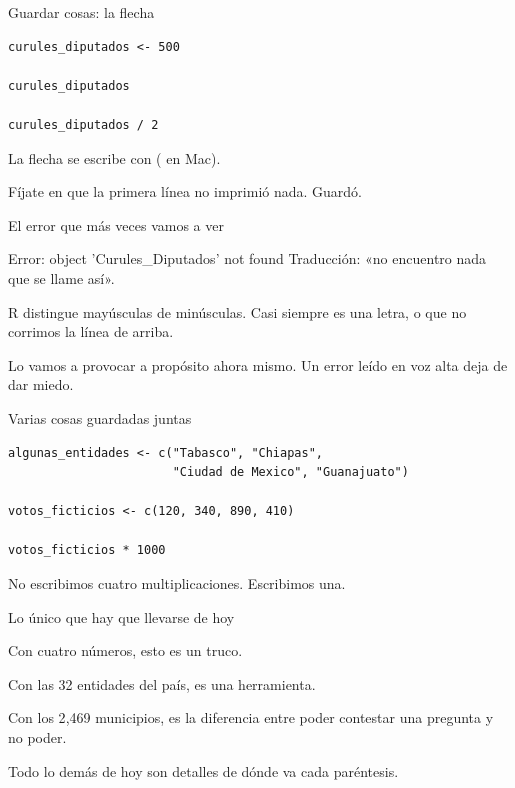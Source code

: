\begin{frame}[fragile]{Guardar cosas: la flecha}
\begin{lstlisting}
curules_diputados <- 500

curules_diputados

curules_diputados / 2
\end{lstlisting}

  \vspace{0.7em}
  La flecha se escribe con  ( en Mac).

  \vspace{0.4em}
  Fíjate en que la primera línea no imprimió nada. Guardó.
\end{frame}

\begin{frame}{El error que más veces vamos a ver}
  \vspace{0.4em}
  \begin{errorbox}{Error: object 'Curules\_Diputados' not found}
    Traducción: «no encuentro nada que se llame así».

    \vspace{0.5em}
    R distingue mayúsculas de minúsculas. Casi siempre es una letra, o que
    no corrimos la línea de arriba.
  \end{errorbox}

  \vspace{1.2em}
  Lo vamos a provocar a propósito ahora mismo. Un error leído en voz alta
  deja de dar miedo.
\end{frame}

\begin{frame}[fragile]{Varias cosas guardadas juntas}
\begin{lstlisting}
algunas_entidades <- c("Tabasco", "Chiapas",
                       "Ciudad de Mexico", "Guanajuato")

votos_ficticios <- c(120, 340, 890, 410)

votos_ficticios * 1000
\end{lstlisting}

  \vspace{0.7em}
  No escribimos cuatro multiplicaciones. Escribimos una.
\end{frame}

\begin{frame}{Lo único que hay que llevarse de hoy}
  \vspace{0.6em}
  \begin{saltobox}
    Con cuatro números, esto es un truco.

    \vspace{0.6em}
    Con las 32 entidades del país, es una herramienta.

    \vspace{0.6em}
    Con los 2{,}469 municipios, es la diferencia entre poder contestar una
    pregunta y no poder.
  \end{saltobox}

  \vspace{1.3em}
  Todo lo demás de hoy son detalles de dónde va cada paréntesis.
\end{frame}

